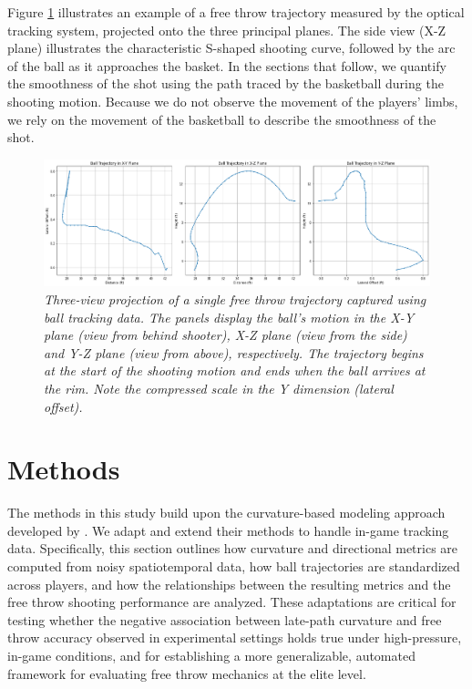 \documentclass{article}
\begin{document}
    Figure \ref{fig:data-description} illustrates an example of a free throw trajectory measured by the optical tracking system, projected onto the three principal planes. The side view (X-Z plane) illustrates the characteristic S-shaped shooting curve, followed by the arc of the ball as it approaches the basket. In the sections that follow, we quantify the smoothness of the shot using the path traced by the basketball during the shooting motion. Because we do not observe the movement of the players' limbs, we rely on the movement of the basketball to describe the smoothness of the shot.

    \begin{figure}[H]
        \centering
        \includegraphics[scale=0.3]{reports/arxiv/data_description.png}
        \caption{\it Three-view projection of a single free throw trajectory captured using ball tracking data. The panels display the ball’s motion in the X-Y plane (view from behind shooter), X-Z plane (view from the side) and Y-Z plane (view from above), respectively. The trajectory begins at the start of the shooting motion and ends when the ball arrives at the rim. Note the compressed scale in the Y dimension (lateral offset).}
        \label{fig:data-description}
      \end{figure}
      
  \section{Methods}
  
    The methods in this study build upon the curvature-based modeling approach developed by \citet{slegers_role_2024}. We adapt and extend their methods to handle in-game tracking data. Specifically, this section outlines how curvature and directional metrics are computed from noisy spatiotemporal data, how ball trajectories are standardized across players, and how the relationships between the resulting metrics and the free throw shooting performance are analyzed. These adaptations are critical for testing whether the negative association between late-path curvature and free throw accuracy observed in experimental settings holds true under high-pressure, in-game conditions, and for establishing a more generalizable, automated framework for evaluating free throw mechanics at the elite level.
\end{document}
